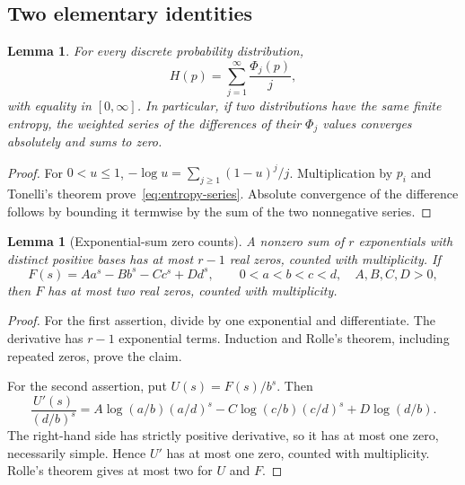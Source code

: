 \documentclass[11pt]{article}
\numberwithin{equation}{section}
\newtheorem{lemma}[theorem]{Lemma}
\begin{document}
\subsection{Two elementary identities}
\begin{lemma}\label{lem:entropy-series}
For every discrete probability distribution,
\begin{equation}\label{eq:entropy-series}
 H(p)=\sum_{j=1}^\infty\frac{\Phi_j(p)}j,
\end{equation}
with equality in $[0,\infty]$. In particular, if two distributions have
the same finite entropy, the weighted series of the differences of their
$\Phi_j$ values converges absolutely and sums to zero.
\end{lemma}
\begin{proof}
For $0<u\le1$,
$-\log u=\sum_{j\ge1}(1-u)^j/j$. Multiplication by $p_i$ and Tonelli's
theorem prove~\eqref{eq:entropy-series}. Absolute convergence of the
difference follows by bounding it termwise by the sum of the two
nonnegative series.
\end{proof}

\begin{lemma}[Exponential-sum zero counts]\label{lem:zero-count}
A nonzero sum of $r$ exponentials with distinct positive bases has at most
$r-1$ real zeros, counted with multiplicity. If
\[
 F(s)=Aa^s-Bb^s-Cc^s+Dd^s,
 \qquad 0<a<b<c<d,\quad A,B,C,D>0,
\]
then $F$ has at most two real zeros, counted with multiplicity.
\end{lemma}
\begin{proof}
For the first assertion, divide by one exponential and differentiate.
The derivative has $r-1$ exponential terms. Induction and Rolle's theorem,
including repeated zeros, prove the claim.

For the second assertion, put $U(s)=F(s)/b^s$. Then
\[
 \frac{U'(s)}{(d/b)^s}
 =A\log(a/b)(a/d)^s-C\log(c/b)(c/d)^s+D\log(d/b).
\]
The right-hand side has strictly positive derivative, so it has at most
one zero, necessarily simple. Hence $U'$ has at most one zero, counted
with multiplicity. Rolle's theorem gives at most two for $U$ and $F$.
\end{proof}
\end{document}
